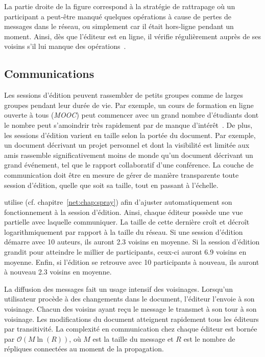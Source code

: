 \noindent La partie droite de la figure correspond à la stratégie de rattrapage
où un participant a peut-être manqué quelques opérations à cause de pertes de
messages dans le réseau, ou simplement car il était hors-ligne pendant un
moment. Ainsi, dès que l'éditeur est en ligne, il vérifie régulièrement auprès
de ses voisins s'il lui manque des opérations~\cite{demers1987epidemic,
  vanderlinde2016delta}.


\subsection{Communications}

Les sessions d'édition peuvent rassembler de petits groupes comme de larges
groupes pendant leur durée de vie. Par exemple, un cours de formation en ligne
ouverte à tous (\emph{MOOC}) peut commencer avec un grand nombre d'étudiants
dont le nombre peut s'amoindrir très rapidement par de manque
d'intérêt~\cite{breslow2013studying}. De plus, les sessions d'édition varient en
taille selon la portée du document. Par exemple, un document décrivant un projet
personnel et dont la visibilité est limitée aux amis rassemble significativement
moins de monde qu'un document décrivant un grand événement, tel que le rapport
collaboratif d'une conférence. La couche de communication doit être en mesure de
gérer de manière transparente toute session d'édition, quelle que soit sa
taille, tout en passant à l'échelle.

\CRATE utilise \SPRAY (cf. chapitre~\ref{net:chap:spray}) afin d'ajuster
automatiquement son fonctionnement à la session d'édition. Ainsi, chaque éditeur
possède une vue partielle avec laquelle communiquer. La taille de cette dernière
croît et décroît logarithmiquement par rapport à la taille du réseau. Si une
session d'édition démarre avec 10 auteurs, ils auront 2.3 voisins en moyenne. Si
la session d'édition grandit pour atteindre le millier de participants, ceux-ci
auront 6.9 voisins en moyenne. Enfin, si l'édition se retrouve avec 10
participants à nouveau, ils auront à nouveau 2.3 voisins en moyenne.

La diffusion des messages fait un usage intensif des voisinages. Lorsqu'un
utilisateur procède à des changements dans le document, l'éditeur l'envoie à son
voisinage. Chacun des voisins ayant reçu le message le transmet à son tour à son
voisinage. Les modifications du document atteignent rapidement tous les
éditeurs par transitivité. La complexité en communication chez chaque éditeur
est bornée par $\mathcal{O}(M\ln(R))$, où $M$ est la taille du message et $R$
est le nombre de répliques connectées au moment de la propagation.


